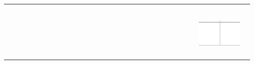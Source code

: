 \documentclass[10pt]{article}
\begin{document}
\begin{center}
\begin{tabular}{|c|c|c|c|c|c|c|c|c|c|c|c|c|c|c|c|c|c|c|c|c|c|c|c|c|c|c|c|c|c|}
\hline
 &  &  &  &  &  &  &  &  &  &  &  &  &  &  &  &  &  &  &  &  &  &  &  &  &  &  &  &  &  \\
\hline
 &  &  &  &  &  &  &  &  &  &  &  &  &  &  &  &  &  &  &  &  &  &  &  &  &  &  &  &  &  \\
\hline
 &  &  &  &  &  &  &  &  &  &  &  &  &  &  &  &  &  &  &  &  &  &  &  &  &  &  &  &  &  \\
\hline
 &  &  &  &  &  &  &  &  &  &  &  &  &  &  &  &  &  &  &  &  &  &  &  &  &  &  &  &  &  \\
\hline
 &  &  &  &  &  &  &  &  &  &  &  &  &  &  &  &  &  &  &  &  &  &  &  &  &  &  &  &  &  \\
\hline
 &  &  &  &  &  &  &  &  &  &  &  &  &  &  &  &  &  &  &  &  &  &  &  &  &  &  &  &  &  \\
\hline
 &  &  &  &  &  &  &  &  &  &  &  &  &  &  &  &  &  &  &  &  &  &  &  &  &  &  &  &  &  \\
\hline
 &  &  &  &  &  &  &  &  &  &  &  &  &  &  &  &  &  &  &  &  &  &  &  &  &  &  &  & \includegraphics[max width=\textwidth]{2024_11_21_e0e8aab895018a50a9a7g-16(1)}
 &  \\
\hline
 &  &  &  &  &  &  &  &  &  &  &  &  &  &  &  &  &  &  &  &  &  &  &  &  &  &  &  &  &  \\
\hline
 &  &  &  &  &  &  &  &  &  &  &  &  &  &  &  &  &  &  &  &  &  &  &  &  &  &  &  &  &  \\
\hline
 &  &  &  &  &  &  &  &  &  &  &  &  &  &  &  &  &  &  &  &  &  &  &  &  &  &  &  &  &  \\
\hline
 &  &  &  &  &  &  &  &  &  &  &  &  &  &  &  &  &  &  &  &  &  &  &  &  &  &  &  &  &  \\
\hline
\end{tabular}
\end{center}
\end{document}
